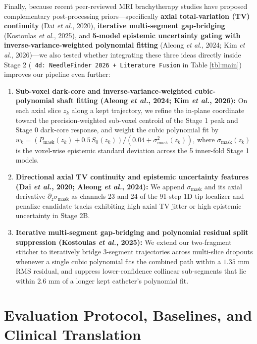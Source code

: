 \documentclass[
  11pt,
]{article}
\providecommand{\tightlist}{%
  \setlength{\itemsep}{0pt}\setlength{\parskip}{0pt}}
\let\nforigtexttt\texttt
\renewcommand{\texttt}[1]{\nforigtexttt{\XeTeXinterchartokenstate=1 #1}}
\begin{document}
Finally, because recent peer-reviewed MRI brachytherapy studies have
proposed complementary post-processing priors---specifically
\textbf{axial total-variation (TV) continuity} (Dai \emph{et al.},
2020), \textbf{iterative multi-segment gap-bridging} (Kostoulas \emph{et
al.}, 2025), and \textbf{5-model epistemic uncertainty gating with
inverse-variance-weighted polynomial fitting} (Aleong \emph{et al.},
2024; Kim \emph{et al.}, 2026)---we also tested whether integrating
these three ideas directly inside Stage 2
(\texttt{4d:\ NeedleFinder\ 2026\ +\ Literature\ Fusion} in Table
\ref{tbl:main}) improves our pipeline even further:

\begin{enumerate}
\def\labelenumi{\arabic{enumi}.}
\tightlist
\item
  \textbf{Sub-voxel dark-core and inverse-variance-weighted
  cubic-polynomial shaft fitting (Aleong \emph{et al.}, 2024; Kim
  \emph{et al.}, 2026):} On each axial slice \(z_k\) along a kept
  trajectory, we refine the in-plane coordinate toward the
  precision-weighted sub-voxel centroid of the Stage 1 peak and Stage 0
  dark-core response, and weight the cubic polynomial fit by
  \(w_k = (P_{\text{mask}}(z_k) + 0.5\,S_0(z_k)) / (0.04 + \sigma_{\text{mask}}^2(z_k))\),
  where \(\sigma_{\text{mask}}(z_k)\) is the voxel-wise epistemic
  standard deviation across the 5 inner-fold Stage 1 models.
\item
  \textbf{Directional axial TV continuity and epistemic uncertainty
  features (Dai \emph{et al.}, 2020; Aleong \emph{et al.}, 2024):} We
  append \(\sigma_{\text{mask}}\) and its axial derivative
  \(\partial_z \sigma_{\text{mask}}\) as channels 23 and 24 of the
  91-step 1D tip localizer and penalize candidate tracks exhibiting high
  axial TV jitter or high epistemic uncertainty in Stage 2B.
\item
  \textbf{Iterative multi-segment gap-bridging and polynomial residual
  split suppression (Kostoulas \emph{et al.}, 2025):} We extend our
  two-fragment stitcher to iteratively bridge 3-segment trajectories
  across multi-slice dropouts whenever a single cubic polynomial fits
  the combined path within a \(1.35\text{ mm}\) RMS residual, and
  suppress lower-confidence collinear sub-segments that lie within
  \(2.6\text{ mm}\) of a longer kept catheter's polynomial fit.
\end{enumerate}

\FloatBarrier

\section{Evaluation Protocol, Baselines, and Clinical
Translation}\label{evaluation-protocol-baselines-and-clinical-translation}
\end{document}
